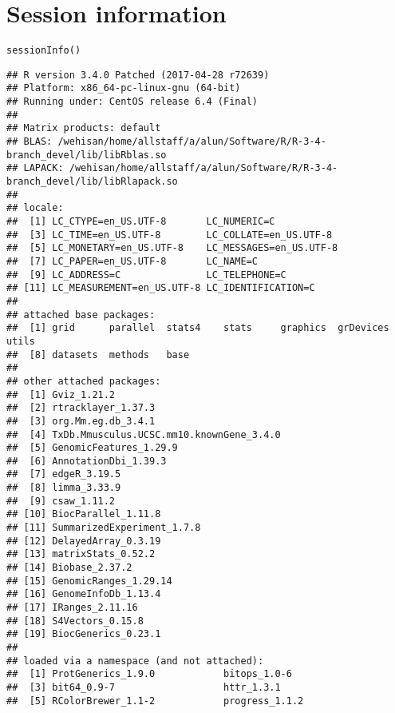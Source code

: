 \documentclass{report}\usepackage[]{graphicx}\usepackage[usenames,dvipsnames]{color}
\newcommand{\hlstd}[1]{\textcolor[rgb]{0.251,0.251,0.251}{#1}}%
\newcommand{\hlkwd}[1]{\textcolor[rgb]{0.878,0.439,0.125}{#1}}%
\newenvironment{knitrout}{}{} %
\begin{document}
\section{Session information}
\begin{knitrout}
\color{fgcolor}\begin{kframe}
\begin{alltt}
\hlkwd{sessionInfo}\hlstd{()}
\end{alltt}
\begin{verbatim}
## R version 3.4.0 Patched (2017-04-28 r72639)
## Platform: x86_64-pc-linux-gnu (64-bit)
## Running under: CentOS release 6.4 (Final)
## 
## Matrix products: default
## BLAS: /wehisan/home/allstaff/a/alun/Software/R/R-3-4-branch_devel/lib/libRblas.so
## LAPACK: /wehisan/home/allstaff/a/alun/Software/R/R-3-4-branch_devel/lib/libRlapack.so
## 
## locale:
##  [1] LC_CTYPE=en_US.UTF-8       LC_NUMERIC=C              
##  [3] LC_TIME=en_US.UTF-8        LC_COLLATE=en_US.UTF-8    
##  [5] LC_MONETARY=en_US.UTF-8    LC_MESSAGES=en_US.UTF-8   
##  [7] LC_PAPER=en_US.UTF-8       LC_NAME=C                 
##  [9] LC_ADDRESS=C               LC_TELEPHONE=C            
## [11] LC_MEASUREMENT=en_US.UTF-8 LC_IDENTIFICATION=C       
## 
## attached base packages:
##  [1] grid      parallel  stats4    stats     graphics  grDevices utils    
##  [8] datasets  methods   base     
## 
## other attached packages:
##  [1] Gviz_1.21.2                             
##  [2] rtracklayer_1.37.3                      
##  [3] org.Mm.eg.db_3.4.1                      
##  [4] TxDb.Mmusculus.UCSC.mm10.knownGene_3.4.0
##  [5] GenomicFeatures_1.29.9                  
##  [6] AnnotationDbi_1.39.3                    
##  [7] edgeR_3.19.5                            
##  [8] limma_3.33.9                            
##  [9] csaw_1.11.2                             
## [10] BiocParallel_1.11.8                     
## [11] SummarizedExperiment_1.7.8              
## [12] DelayedArray_0.3.19                     
## [13] matrixStats_0.52.2                      
## [14] Biobase_2.37.2                          
## [15] GenomicRanges_1.29.14                   
## [16] GenomeInfoDb_1.13.4                     
## [17] IRanges_2.11.16                         
## [18] S4Vectors_0.15.8                        
## [19] BiocGenerics_0.23.1                     
## 
## loaded via a namespace (and not attached):
##  [1] ProtGenerics_1.9.0            bitops_1.0-6                 
##  [3] bit64_0.9-7                   httr_1.3.1                   
##  [5] RColorBrewer_1.1-2            progress_1.1.2               

\end{verbatim}
\end{kframe}
\end{knitrout}
\end{document}
